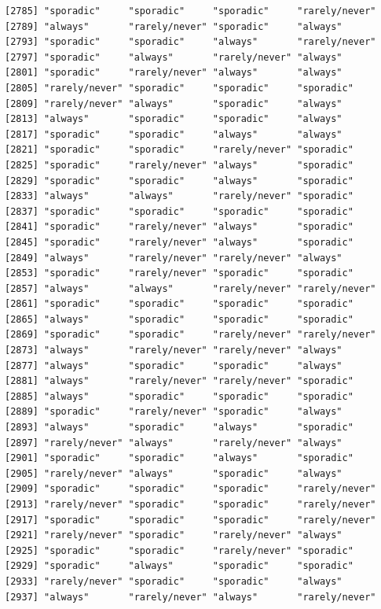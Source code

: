 \documentclass[
  letterpaper,
  DIV=11,
  numbers=noendperiod]{scrartcl}
\begin{document}
\begin{verbatim}
[2785] "sporadic"     "sporadic"     "sporadic"     "rarely/never"
[2789] "always"       "rarely/never" "sporadic"     "always"      
[2793] "sporadic"     "sporadic"     "always"       "rarely/never"
[2797] "sporadic"     "always"       "rarely/never" "always"      
[2801] "sporadic"     "rarely/never" "always"       "always"      
[2805] "rarely/never" "sporadic"     "sporadic"     "sporadic"    
[2809] "rarely/never" "always"       "sporadic"     "always"      
[2813] "always"       "sporadic"     "sporadic"     "always"      
[2817] "sporadic"     "sporadic"     "always"       "always"      
[2821] "sporadic"     "sporadic"     "rarely/never" "sporadic"    
[2825] "sporadic"     "rarely/never" "always"       "sporadic"    
[2829] "sporadic"     "sporadic"     "always"       "sporadic"    
[2833] "always"       "always"       "rarely/never" "sporadic"    
[2837] "sporadic"     "sporadic"     "sporadic"     "sporadic"    
[2841] "sporadic"     "rarely/never" "always"       "sporadic"    
[2845] "sporadic"     "rarely/never" "always"       "sporadic"    
[2849] "always"       "rarely/never" "rarely/never" "always"      
[2853] "sporadic"     "rarely/never" "sporadic"     "sporadic"    
[2857] "always"       "always"       "rarely/never" "rarely/never"
[2861] "sporadic"     "sporadic"     "sporadic"     "sporadic"    
[2865] "always"       "sporadic"     "sporadic"     "sporadic"    
[2869] "sporadic"     "sporadic"     "rarely/never" "rarely/never"
[2873] "always"       "rarely/never" "rarely/never" "always"      
[2877] "always"       "sporadic"     "sporadic"     "always"      
[2881] "always"       "rarely/never" "rarely/never" "sporadic"    
[2885] "always"       "sporadic"     "sporadic"     "sporadic"    
[2889] "sporadic"     "rarely/never" "sporadic"     "always"      
[2893] "always"       "sporadic"     "always"       "sporadic"    
[2897] "rarely/never" "always"       "rarely/never" "always"      
[2901] "sporadic"     "sporadic"     "always"       "sporadic"    
[2905] "rarely/never" "always"       "sporadic"     "always"      
[2909] "sporadic"     "sporadic"     "sporadic"     "rarely/never"
[2913] "rarely/never" "sporadic"     "sporadic"     "rarely/never"
[2917] "sporadic"     "sporadic"     "sporadic"     "rarely/never"
[2921] "rarely/never" "sporadic"     "rarely/never" "always"      
[2925] "sporadic"     "sporadic"     "rarely/never" "sporadic"    
[2929] "sporadic"     "always"       "sporadic"     "sporadic"    
[2933] "rarely/never" "sporadic"     "sporadic"     "always"      
[2937] "always"       "rarely/never" "always"       "rarely/never"

\end{verbatim}
\end{document}
